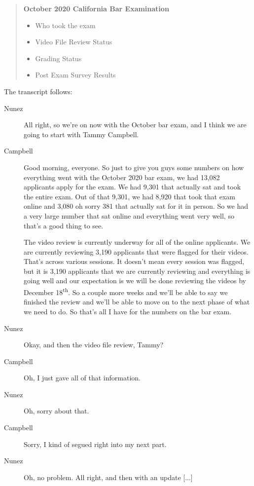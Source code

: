 \begin{quote}
\textbf{October 2020 California Bar Examination}
\begin{itemize}
\item Who took the exam
\item Video File Review Status
\item Grading Status
\item Post Exam Survey Results
\end{itemize}
\end{quote}

\noindent The transcript follows:

\begin{description}
\item[Nunez] All right, so we're on now with the October bar exam, and I think
    we are going to start with Tammy Campbell.
\item[Campbell] Good morning, everyone. So just to give you guys some numbers on
    how everything went with the October 2020 bar exam, we had 13,082 applicants
    apply for the exam. We had 9,301 that actually sat and took the entire exam.
    Out of that 9,301, we had 8,920 that took that exam online and 3,080 oh
    sorry 381 that actually sat for it in person. So we had a very large number
    that sat online and everything went very well, so that's a good thing to
    see.

    The video review is currently underway for all of the online applicants. We
    are currently reviewing 3,190 applicants that were flagged for their videos.
    That's across various sessions. It doesn't mean every session was flagged,
    but it is 3,190 applicants that we are currently reviewing and everything is
    going well and our expectation is we will be done reviewing the videos by
    December 18\textsuperscript{th}. So a couple more weeks and we'll be able to
    say we finished the review and we'll be able to move on to the next phase of
    what we need to do. So that's all I have for the numbers on the bar exam.
\item[Nunez] Okay, and then the video file review, Tammy?
\item[Campbell] Oh, I just gave all of that information.
\item[Nunez] Oh, sorry about that.
\item[Campbell] Sorry, I kind of segued right into my next part.
\item[Nunez] Oh, no problem. All right, and then with an update [...]
\end{description}

